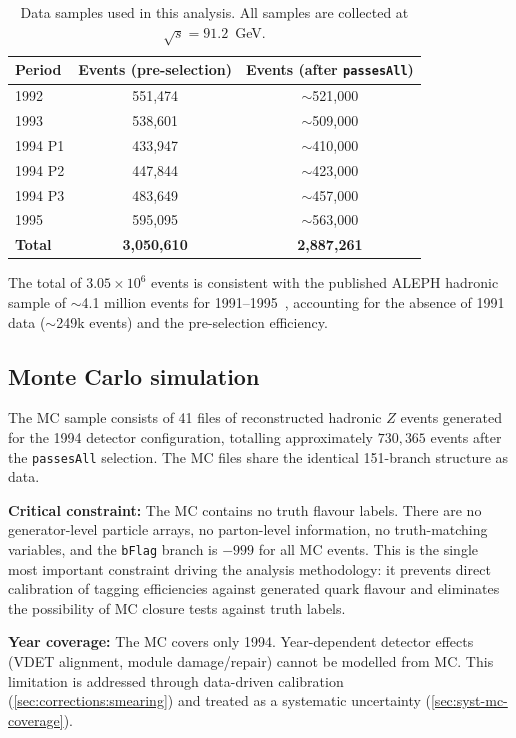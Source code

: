 \documentclass[11pt,a4paper]{article}
\begin{document}
\begin{table}[htbp]
\centering
\caption{Data samples used in this analysis. All samples are
collected at $\sqrt{s} = 91.2$~GeV.}
\label{tbl:data}
\begin{tabular}{lcc}
\toprule
Period & Events (pre-selection) & Events (after \texttt{passesAll}) \\
\midrule
1992 & 551,474 & $\sim$521,000 \\
1993 & 538,601 & $\sim$509,000 \\
1994 P1 & 433,947 & $\sim$410,000 \\
1994 P2 & 447,844 & $\sim$423,000 \\
1994 P3 & 483,649 & $\sim$457,000 \\
1995 & 595,095 & $\sim$563,000 \\
\midrule
\textbf{Total} & \textbf{3,050,610} & \textbf{2,887,261} \\
\bottomrule
\end{tabular}
\end{table}

The total of $3.05 \times 10^6$ events is consistent with the
published ALEPH hadronic sample of $\sim$4.1 million events for
1991--1995~\cite{ALEPH:AFBb}, accounting for the absence of 1991
data ($\sim$249k events) and the pre-selection efficiency.

\subsection{Monte Carlo simulation}
\label{sec:data:mc}

The MC sample consists of 41 files of reconstructed hadronic $Z$
events generated for the 1994 detector configuration, totalling
approximately $730{,}365$ events after the \texttt{passesAll}
selection.
The MC files share the identical 151-branch structure as data.

\textbf{Critical constraint:} The MC contains no truth flavour
labels.
There are no generator-level particle arrays, no parton-level
information, no truth-matching variables, and the \texttt{bFlag}
branch is $-999$ for all MC events.
This is the single most important constraint driving the analysis
methodology: it prevents direct calibration of tagging efficiencies
against generated quark flavour and eliminates the possibility of
MC closure tests against truth labels.

\textbf{Year coverage:} The MC covers only 1994.
Year-dependent detector effects (VDET alignment, module
damage/repair) cannot be modelled from MC.
This limitation is addressed through data-driven calibration
(\cref{sec:corrections:smearing}) and treated as a systematic
uncertainty (\cref{sec:syst-mc-coverage}).
\end{document}
